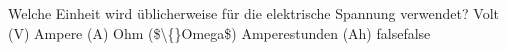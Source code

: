     {Welche Einheit wird üblicherweise für die elektrische Spannung verwendet?}
    {Volt (V)}
    {Ampere (A)}
    {Ohm (\$\textbackslash\{\}Omega\$)}
    {Amperestunden (Ah)}
    {false}{false}